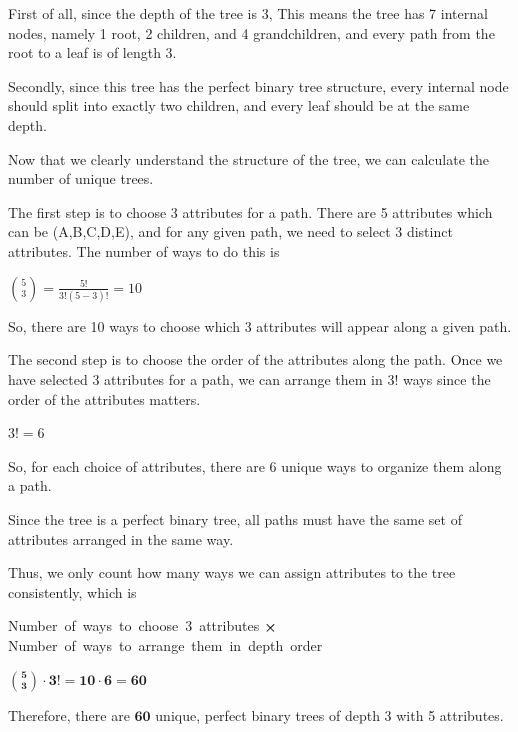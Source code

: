 \documentclass[12pt,letterpaper, onecolumn]{exam}
\begin{document}
\begin{questions}
\begin{parts}
\begin{solution}
        First of all, since the depth of the tree is 3,
        This means the tree has 7 internal nodes, namely 1 root, 2 children, and 4 grandchildren, 
        and every path from the root to a leaf is of length 3.

        Secondly, since this tree has the perfect binary tree structure, every internal node should split into exactly two children,
        and every leaf should be at the same depth.

        Now that we clearly understand the structure of the tree, we can calculate the number of unique trees.

        The first step is to choose 3 attributes for a path. There are 5 attributes which can be (A,B,C,D,E),
        and for any given path, we need to select 3 distinct attributes. The number of ways to do this is

        \begin{center}
            $\displaystyle{\binom{5}{3} = \frac{5!}{3!(5-3)!} = 10}$
        \end{center}

        So, there are 10 ways to choose which 3 attributes will appear along a given path.

        The second step is to choose the order of the attributes along the path.
        Once we have selected 3 attributes for a path, we can arrange them in $3!$ ways
        since the order of the attributes matters.

        \begin{center}
            $\displaystyle{3! = 6}$
        \end{center}

        So, for each choice of attributes, there are $6$ unique ways to organize them along a path.

        Since the tree is a perfect binary tree, all paths must have the same set of attributes arranged in the same way.

        Thus, we only count how many ways we can assign attributes to the tree consistently, which is 

        \begin{center}
            Number of ways to choose 3 attributes $\displaystyle{\cross}$ Number of ways to arrange them in depth order

            $\boldsymbol{\displaystyle{\binom{5}{3} \cdot 3! = 10 \cdot 6 = 60}}$
        \end{center}

        Therefore, there are $\boldsymbol{60}$ unique, perfect binary trees of depth 3 with 5 attributes.


\end{solution}
\end{parts}
\end{questions}
\end{document}

